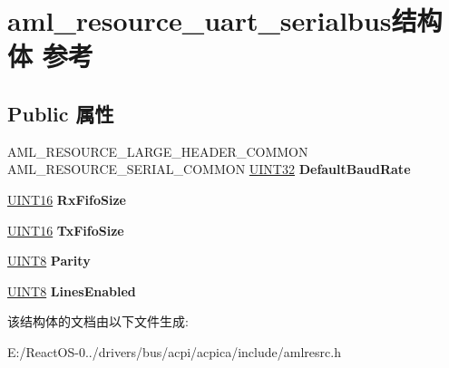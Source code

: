 \hypertarget{structaml__resource__uart__serialbus}{}\section{aml\+\_\+resource\+\_\+uart\+\_\+serialbus结构体 参考}
\label{structaml__resource__uart__serialbus}
\subsection*{Public 属性}
\begin{DoxyCompactItemize}
\item 
\mbox{\label{structaml__resource__uart__serialbus_a0277d7244ab597db281239b8fe6429dc}} 
A\+M\+L\+\_\+\+R\+E\+S\+O\+U\+R\+C\+E\+\_\+\+L\+A\+R\+G\+E\+\_\+\+H\+E\+A\+D\+E\+R\+\_\+\+C\+O\+M\+M\+ON A\+M\+L\+\_\+\+R\+E\+S\+O\+U\+R\+C\+E\+\_\+\+S\+E\+R\+I\+A\+L\+\_\+\+C\+O\+M\+M\+ON \hyperlink{_processor_bind_8h_ae1e6edbbc26d6fbc71a90190d0266018}{U\+I\+N\+T32} {\bfseries Default\+Baud\+Rate}
\item 
\mbox{\label{structaml__resource__uart__serialbus_abc4b0518b777e05a45553b85bdf3d775}} 
\hyperlink{_processor_bind_8h_a09f1a1fb2293e33483cc8d44aefb1eb1}{U\+I\+N\+T16} {\bfseries Rx\+Fifo\+Size}
\item 
\mbox{\label{structaml__resource__uart__serialbus_a0637aaa3a1e7ba3e3c8ca617cb283c71}} 
\hyperlink{_processor_bind_8h_a09f1a1fb2293e33483cc8d44aefb1eb1}{U\+I\+N\+T16} {\bfseries Tx\+Fifo\+Size}
\item 
\mbox{\label{structaml__resource__uart__serialbus_a462995437794a0d153ba6b58766aea19}} 
\hyperlink{_processor_bind_8h_ab27e9918b538ce9d8ca692479b375b6a}{U\+I\+N\+T8} {\bfseries Parity}
\item 
\mbox{\label{structaml__resource__uart__serialbus_aa964ee8ef3c0815e6389b687a4a5ad79}} 
\hyperlink{_processor_bind_8h_ab27e9918b538ce9d8ca692479b375b6a}{U\+I\+N\+T8} {\bfseries Lines\+Enabled}
\end{DoxyCompactItemize}


该结构体的文档由以下文件生成\+:\begin{DoxyCompactItemize}
\item 
E\+:/\+React\+O\+S-\/0../drivers/bus/acpi/acpica/include/amlresrc.\+h\end{DoxyCompactItemize}
